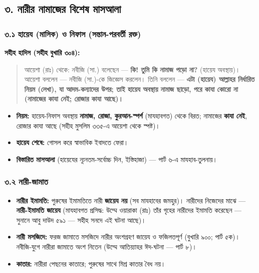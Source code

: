 \subsection*{৩. নারীর নামাজের বিশেষ মাসআলা}

\subsubsection*{৩.১ হায়েয (মাসিক) ও নিফাস (সন্তান-পরবর্তী রক্ত)}

\textbf{সহীহ হাদিস (সহীহ বুখারি ৩০৪):}

\begin{quote}
আয়েশা (রাঃ) থেকে: নবীজি (সা.) বলেছেন — \textbf{কি! তুমি কি নামাজ পড়ো না?} (হায়েয অবস্থায়)। আয়েশা বললেন — নবীজি (সা.)-কে জিজ্ঞেস করলেন। তিনি বললেন — \textbf{এটা (হায়েয) আল্লাহর নির্ধারিত নিয়ম (লেখা), যা আদম-কন্যাদের উপর; তাই হায়েয অবস্থায় নামাজ ছাড়ো, পরে কাযা কোরো না (নামাজের কাযা নেই; রোজার কাযা আছে)।}
\end{quote}

\begin{itemize}
\item \textbf{নিয়ম:} হায়েয-নিফাস অবস্থায় \textbf{নামাজ, রোজা, কুরআন-স্পর্শ} (মাযহাবগত) থেকে বিরত; নামাজের \textbf{কাযা নেই}, রোজার কাযা আছে (সহীহ মুসলিম ৩৩৫-এ আয়েশা থেকে স্পষ্ট)।
\item \textbf{হায়েয শেষে:} গোসল করে স্বাভাবিক ইবাদতে ফেরা।
\item \textbf{বিস্তারিত মাসআলা} (হায়েযের ন্যূনতম-সর্বোচ্চ দিন, ইস্তিহাজা) — পার্ট ৬-এ মাযহাব-তুলনায়।
\end{itemize}
\subsubsection*{৩.২ নারী-জামাত}

\begin{itemize}
\item \textbf{নারীর ইমামতি:} পুরুষের ইমামতিতে নারী \textbf{জায়েয নয়} (সব মাযহাবের জমহুর)। নারীদের নিজেদের মাঝে — \textbf{নারী-ইমামতি জায়েয} (মাযহাবগত প্রসিদ্ধ: উম্মে ওয়ারাকা (রাঃ) তাঁর গৃহের নারীদের ইমামতি করেছেন — সুনানে আবু দাউদ ৫৯১ — সহীহ সনদে এই ঘটনা আছে)।
\item \textbf{নারী মসজিদে:} ফরজ জামাতে মসজিদে নারীর অংশগ্রহণ জায়েয ও ফজিলতপূর্ণ (বুখারি ৯০০; পার্ট ৫ক)। নবীজি-যুগে নারীরা জামাতে অংশ নিতেন (উম্মে আতিয়্যাহর ঈদ-ঘটনা — পার্ট ৮)।
\item \textbf{কাতার:} নারীরা পেছনের কাতারে; পুরুষের সাথে মিশ্র কাতার বৈধ নয়।
\end{itemize}
